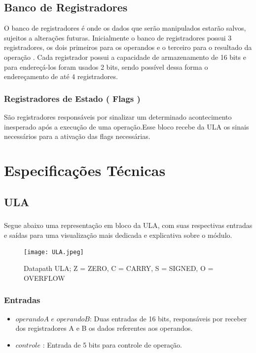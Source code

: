 \documentclass{report}
\begin{document}
\section{Banco de Registradores}
O banco de registradores é onde os dados que serão manipulados estarão salvos, sujeitos a alterações futuras. Inicialmente o banco de registradores possui 3 registradores, os dois primeiros para os operandos e o terceiro para o resultado da operação . Cada registrador possui a capacidade de armazenamento de 16 bits e para endereçá-los foram usados 2 bits, sendo possível dessa forma o endereçamento de até 4 registradores.


\subsection{Registradores de Estado ( Flags )}
São registradores responsáveis por sinalizar um determinado acontecimento inesperado após a execução de uma operação.Esse bloco recebe da ULA os sinais necessários para a ativação das flags necessárias.



\chapter{Especificações Técnicas}
    \section{ULA}
    \paragraph{} 
    Segue abaixo uma representação em bloco da ULA, com suas respectivas entradas e saídas para uma visualização mais dedicada e explicativa sobre o módulo. 
    
    \begin{figure}[H] \centering \texttt{[image: ULA.jpeg]}                \caption{Datapath ULA; Z = ZERO, C = CARRY, S = SIGNED, O = OVERFLOW} \label{fig:mesh1} 
    \end{figure}
    
    \subsection{Entradas}
\begin{itemize}
\item $operandoA$ $e$ $operandoB$: Duas entradas de 16 bits, responsáveis por receber dos registradores A e B os dados referentes aos operandos.
\item $controle$ : Entrada de 5 bits para controle de operação.
\end{itemize}
\end{document}
